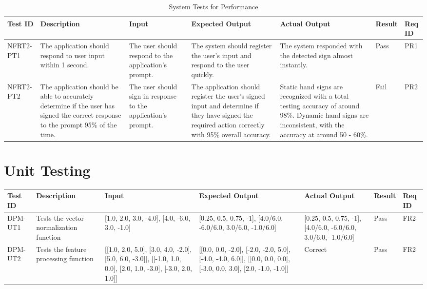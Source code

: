 \documentclass[12pt, titlepage]{article}
\begin{document}
\begin{longtable}{|p{1.5cm}|p{2.5cm}|p{2cm}|p{2cm}|p{2cm}|p{1.5cm}|p{1cm}|}
\caption{System Tests for Performance} \\
\hline
\textbf{Test ID} & \textbf{Description} & \textbf{Input} & \textbf{Expected Output} & \textbf{Actual Output} & \textbf{Result} & \textbf{Req ID}\\
\hline
NFRT2-PT1 & The application should respond to user input within 1 second. & The user should respond to the application's prompt. & The system should register the user's input and respond to the user quickly. & The system responded with the detected sign almost instantly. & Pass & PR1 \\
\hline
NFRT2-PT2 & The application should be able to accurately determine if the user has signed the correct response to the prompt 95\% of the time. & The user should sign in response to the application's prompt. & The application should register the user's signed input and determine if they have signed the required action correctly with 95\% overall accuracy. & Static hand signs are recognized with a total testing accuracy of around 98\%. Dynamic hand signs are inconsistent, with the accuracy at around 50 - 60\%.  & Fail & PR2 \\
\bottomrule
\end{longtable}
	

\newpage
\section{Unit Testing}

\begin{longtable}{|p{1cm}|p{2.5cm}|p{2cm}|p{3cm}|p{3cm}|p{1cm}|p{1cm}|}
\hline
\textbf{Test ID} & \textbf{Description} & \textbf{Input} & \textbf{Expected Output} & \textbf{Actual Output} & \textbf{Result} & \textbf{Req ID}\\
\hline
DPM-UT1 & Tests the vector normalization function & [1.0, 2.0, 3.0, -4.0], [4.0, -6.0, 3.0, -1.0] & [0.25, 0.5, 0.75, -1], [4.0/6.0, -6.0/6.0, 3.0/6.0, -1.0/6.0] & [0.25, 0.5, 0.75, -1], [4.0/6.0, -6.0/6.0, 3.0/6.0, -1.0/6.0] & Pass & FR2 \\
\hline
DPM-UT2 & Tests the feature processing function & [[1.0, 2.0, 5.0], [3.0, 4.0, -2.0], [5.0, 6.0, -3.0]], [[-1.0, 1.0, 0.0], [2.0, 1.0, -3.0], [-3.0, 2.0, 1.0]] & [[0.0, 0.0, -2.0], [-2.0, -2.0, 5.0], [-4.0, -4.0, 6.0]], [[0.0, 0.0, 0.0], [-3.0, 0.0, 3.0], [2.0, -1.0, -1.0]] & Correct & Pass & FR2 \\
\bottomrule
\end{longtable}
\end{document}
